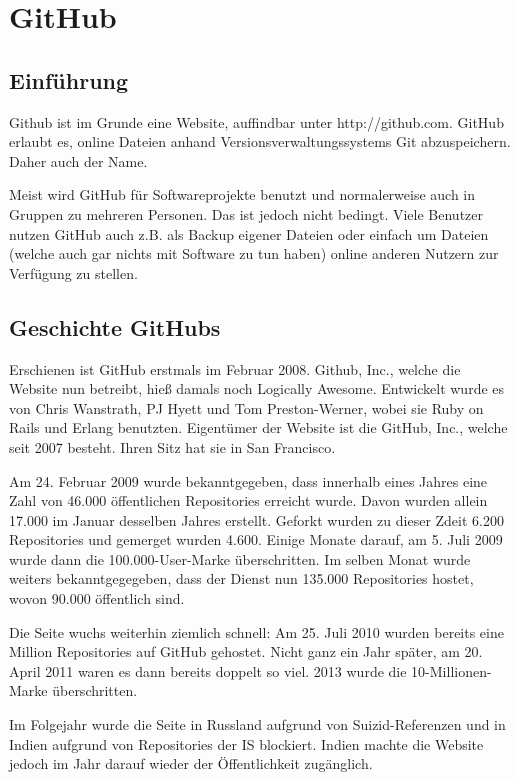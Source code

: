 \section{GitHub}

\subsection{Einführung}
Github ist im Grunde eine Website, auffindbar unter http://github.com. GitHub erlaubt es, online Dateien anhand Versionsverwaltungssystems Git
abzuspeichern. Daher auch der Name.

Meist wird GitHub für Softwareprojekte benutzt und normalerweise auch in Gruppen zu mehreren Personen. Das ist jedoch nicht bedingt. Viele Benutzer nutzen GitHub auch z.B. als Backup eigener Dateien oder einfach um Dateien (welche auch gar nichts mit Software zu tun haben) online anderen Nutzern zur Verfügung zu stellen.

\subsection{Geschichte GitHubs}
Erschienen ist GitHub erstmals im Februar 2008. Github, Inc., welche die Website nun betreibt, hieß damals noch Logically Awesome. Entwickelt wurde es von Chris Wanstrath, PJ Hyett und Tom Preston-Werner, wobei sie Ruby on Rails und Erlang benutzten. Eigentümer der Website ist die GitHub, Inc., welche seit 2007 besteht. Ihren Sitz hat sie in San Francisco.

Am 24. Februar 2009 wurde bekanntgegeben, dass innerhalb eines Jahres eine Zahl von 46.000 öffentlichen Repositories erreicht wurde. Davon wurden allein 17.000 im Januar desselben Jahres erstellt. Geforkt wurden zu dieser Zdeit 6.200 Repositories und gemerget wurden 4.600. Einige Monate darauf, am 5. Juli 2009 wurde dann die 100.000-User-Marke überschritten. Im selben Monat wurde weiters bekanntgegegeben, dass der Dienst nun 135.000 Repositories hostet, wovon 90.000 öffentlich sind.

Die Seite wuchs weiterhin ziemlich schnell: Am 25. Juli 2010 wurden bereits eine Million Repositories auf GitHub gehostet. Nicht ganz ein Jahr später, am 20. April 2011 waren es dann bereits doppelt so viel. 2013 wurde die 10-Millionen-Marke überschritten.

Im Folgejahr wurde die Seite in Russland aufgrund von Suizid-Referenzen und in Indien aufgrund von Repositories der IS blockiert. Indien machte die Website jedoch im Jahr darauf wieder der Öffentlichkeit zugänglich.

